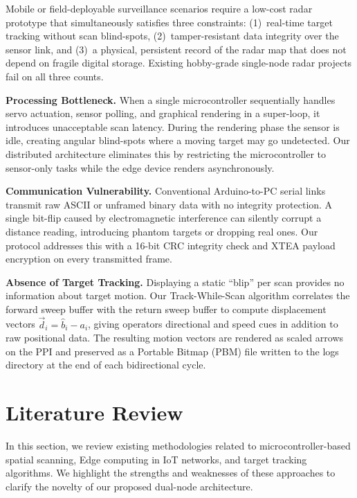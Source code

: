 \documentclass[14pt]{article}
\begin{document}
Mobile or field-deployable surveillance scenarios require a low-cost radar
prototype that simultaneously satisfies three constraints: (1)~real-time
target tracking without scan blind-spots, (2)~tamper-resistant data integrity
over the sensor link, and (3)~a physical, persistent record of the radar map
that does not depend on fragile digital storage. Existing hobby-grade
single-node radar projects fail on all three counts.

\textbf{Processing Bottleneck.} When a single microcontroller sequentially
handles servo actuation, sensor polling, and graphical rendering in a
super-loop, it introduces unacceptable scan latency. During the rendering phase
the sensor is idle, creating angular blind-spots where a moving target may go
undetected. Our distributed architecture eliminates this by restricting the
microcontroller to sensor-only tasks while the edge device renders
asynchronously.

\textbf{Communication Vulnerability.} Conventional Arduino-to-PC serial links
transmit raw ASCII or unframed binary data with no integrity protection. A
single bit-flip caused by electromagnetic interference can silently corrupt a
distance reading, introducing phantom targets or dropping real ones. Our
protocol addresses this with a 16-bit CRC integrity check and XTEA payload
encryption on every transmitted frame.

\textbf{Absence of Target Tracking.} Displaying a static ``blip'' per scan
provides no information about target motion. Our Track-While-Scan algorithm
correlates the forward sweep buffer with the return sweep buffer to compute
displacement vectors $\vec{d}_i = \hat{b}_i - a_i$, giving operators
directional and speed cues in addition to raw positional data. The resulting
motion vectors are rendered as scaled arrows on the PPI and preserved as a
Portable Bitmap (PBM) file written to the logs directory at the end of each
bidirectional cycle.



\section{Literature Review}
\iffalse
In this section, we review existing methodologies related to microcontroller-based spatial scanning, Edge computing in IoT networks, and target tracking algorithms. We highlight the strengths and weaknesses of these approaches to clarify the novelty of our proposed dual-node architecture.
\end{document}
